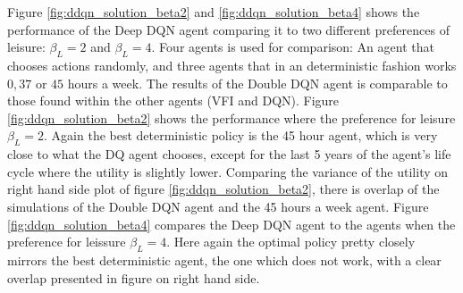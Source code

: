 Figure \ref{fig:ddqn_solution_beta2} and \ref{fig:ddqn_solution_beta4} shows the performance of the Deep DQN agent comparing it to two different preferences of leisure: $\beta_L = 2$ and $\beta_L = 4$. Four agents is used for comparison: An agent that chooses actions randomly, and three agents that in an deterministic fashion works $0, 37$ or $45$ hours a week. The results of the Double DQN agent is comparable to those found within the other agents (VFI and DQN). Figure \ref{fig:ddqn_solution_beta2} shows the performance where the preference for leisure $\beta_L = 2$. Again the best deterministic policy is the 45 hour agent, which is very close to what the DQ agent chooses, except for the last 5 years of the agent's life cycle where the utility is slightly lower. Comparing the variance of the utility on right hand side plot of figure \ref{fig:ddqn_solution_beta2}, there is overlap of the simulations of the Double DQN agent and the 45 hours a week agent. Figure \ref{fig:ddqn_solution_beta4} compares the Deep DQN agent to the agents when the preference for leissure $\beta_L = 4$. Here again the optimal policy pretty closely mirrors the best deterministic agent, the one which does not work, with a clear overlap presented in figure on right hand side.
